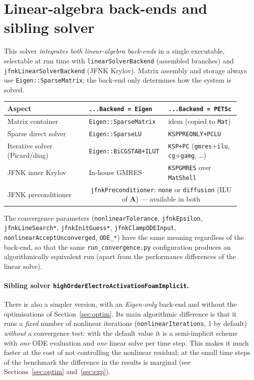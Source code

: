 \documentclass[11pt,a4paper]{article}
\newcommand{\code}[1]{\texttt{\small #1}}
\newcommand{\Aimp}{\mathbf{A}}
\begin{document}
\section{Linear-algebra back-ends and sibling solver}
\label{sec:backends}

This solver \emph{integrates both linear-algebra back-ends} in a single
executable, selectable at run time with \code{linearSolverBackend} (assembled
branches) and \code{jfnkLinearSolverBackend} (JFNK Krylov). Matrix assembly and
storage always use \code{Eigen::SparseMatrix}; the back-end only
determines how the system is solved.

\begin{center}
\begin{tabular}{@{}p{0.34\linewidth}p{0.30\linewidth}p{0.30\linewidth}@{}}
\toprule
Aspect & \code{...Backend = Eigen} & \code{...Backend = PETSc} \\
\midrule
Matrix container & \code{Eigen::SparseMatrix} & idem (copied to \code{Mat}) \\
Sparse direct solver & \code{Eigen::SparseLU} & \code{KSPPREONLY+PCLU} \\
Iterative solver (Picard/diag) & \code{Eigen::BiCGSTAB+ILUT} &
    \code{KSP+PC} (\code{gmres}+\code{ilu}, \code{cg}+\code{gamg}, \dots) \\
JFNK inner Krylov & In-house GMRES & \code{KSPGMRES} over \code{MatShell} \\
JFNK preconditioner & \multicolumn{2}{c}{\code{jfnkPreconditioner}: \code{none} or
    \code{diffusion} (ILU of $\Aimp$) --- available in both} \\
\bottomrule
\end{tabular}
\end{center}

The convergence parameters (\code{nonlinearTolerance}, \code{jfnkEpsilon},
\code{jfnkLineSearch*}, \code{jfnkInitGuess*}, \code{jfnkClampODEInput},
\code{nonlinearAcceptUnconverged}, \code{ODE\_*}) have the same meaning
regardless of the back-end, so that the same \code{run\_convergence.py}
configuration produces an algorithmically equivalent run (apart from
the performance differences of the linear solve).

\paragraph{Sibling solver \code{highOrderElectroActivationFoamImplicit}.}
There is also a simpler version, with an \emph{Eigen-only} back-end and without the
optimisations of Section~\ref{sec:optim}. Its main algorithmic difference is
that it runs a \emph{fixed} number of nonlinear iterations (\code{nonlinearIterations},
$1$ by default) \emph{without} a convergence test: with the default value it is a
semi-implicit scheme with \emph{one} ODE evaluation and \emph{one} linear solve per
time step. This makes it much faster at the cost of not controlling the nonlinear
residual; at the small time steps of the benchmark the difference in the results
is marginal (see Sections~\ref{sec:optim} and~\ref{sec:exp}).
\end{document}
